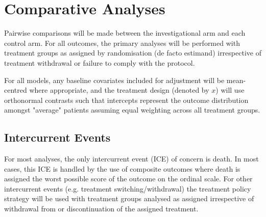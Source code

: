 \documentclass[11pt,parskip=half-]{scrartcl}
\begin{document}
\clearpage

\section{Comparative Analyses}

Pairwise comparisons will be made between the investigational arm and each control arm. For all outcomes, the primary analyses will be performed with treatment groups as assigned by randomisation (de facto estimand) irrespective of treatment withdrawal or failure to comply with the protocol.

For all models, any baseline covariates included for adjustment will be mean-centred where appropriate, and the treatment design (denoted by $x$) will use orthonormal contrasts such that intercepts represent the outcome distribution amongst "average" patients assuming equal weighting across all treatment groups.

\subsection{Intercurrent Events}

For most analyses, the only intercurrent event (ICE) of concern is death. In most cases, this ICE is handled by the use of composite outcomes where death is assigned the worst possible score of the outcome on the ordinal scale. For other intercurrent events (e.g. treatment switching/withdrawal) the treatment policy strategy will be used with treatment groups analysed as assigned irrespective of withdrawal from or discontinuation of the assigned treatment.
\end{document}
